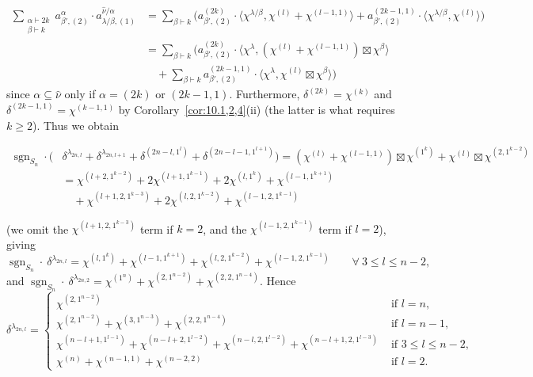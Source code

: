 \documentclass[ALCO, Unicode]{cedram}
\newcommand{\sgn}{\operatorname{sgn}}
\begin{document}
\begin{example}
\begin{align*}
		\sum_{\substack{\alpha\vdash 2k\\\beta\vdash k}} a^{\alpha}_{\beta',(2)}\cdot a^{\hat{\nu}/\alpha}_{\lambda/\beta,(1)} &= \sum_{\beta\vdash k} \big(a^{(2k)}_{\beta',(2)}\cdot\langle \chi^{\lambda/\beta},\chi^{(l)}+\chi^{(l-1,1)}\rangle + a^{(2k-1,1)}_{\beta',(2)}\cdot\langle\chi^{\lambda/\beta},\chi^{(l)}\rangle \big)\\
		&= \sum_{\beta\vdash k} \big(a^{(2k)}_{\beta',(2)}\cdot\langle \chi^{\lambda},(\chi^{(l)}+\chi^{(l-1,1)})\boxtimes\chi^\beta\rangle \\&\quad+ \sum_{\beta\vdash k}a^{(2k-1,1)}_{\beta',(2)}\cdot\langle\chi^{\lambda},\chi^{(l)}\boxtimes\chi^\beta\rangle \big)
	\end{align*}
	since $\alpha\subseteq\hat{\nu}$ only if $\alpha=(2k)$ or $(2k-1,1)$. Furthermore, $\delta^{(2k)}=\chi^{(k)}$ and $\delta^{(2k-1,1)}=\chi^{(k-1,1)}$ by Corollary~\ref{cor:10.1,2,4}(ii) (the latter is what requires $k\ge 2$). Thus we obtain
	
	\begin{footnotesize}
		\begin{align}\label{eqn:14.8b}
			\sgn_{S_n}\cdot(&\delta^{\lambda_{2n,l}} + \delta^{\lambda_{2n,l+1}} + \delta^{(2n-l,1^l)} + \delta^{(2n-l-1,1^{l+1})}) = (\chi^{(l)}+\chi^{(l-1,1)})\boxtimes\chi^{(1^k)} + \chi^{(l)}\boxtimes\chi^{(2,1^{k-2})}\nonumber\\
			&= \chi^{(l+2,1^{k-2})} + 2\chi^{(l+1,1^{k-1})} + 2\chi^{(l,1^k)} + \chi^{(l-1,1^{k+1})}\nonumber\\&\quad +\chi^{(l+1,2,1^{k-3})} + 2\chi^{(l,2,1^{k-2})}+\chi^{(l-1,2,1^{k-1})}
		\end{align}
	\end{footnotesize}
(we omit the $\chi^{(l+1,2,1^{k-3})}$ term if $k=2$, and the $\chi^{(l-1,2,1^{k-1})}$ term if $l=2$), giving
	\[ \sgn_{S_n}\cdot\ \delta^{\lambda_{2n,l}} = \chi^{(l,1^k)}+\chi^{(l-1,1^{k+1})} + \chi^{(l,2,1^{k-2})} + \chi^{(l-1,2,1^{k-1})}\qquad\forall\ 3\le l\le n-2, \]
	and $\sgn_{S_n}\cdot\ \delta^{\lambda_{2n,2}} = \chi^{(1^n)}+\chi^{(2,1^{n-2})}+\chi^{(2,2,1^{n-4})}$. Hence	
	\footnotesize
	\[ \delta^{\lambda_{2n,l}} = \begin{cases}
		\chi^{(2,1^{n-2})} & \text{ if } l=n,\\
		\chi^{(2,1^{n-2})} + \chi^{(3,1^{n-3})} + \chi^{(2,2,1^{n-4})} & \text{ if } l=n-1,\\
		\chi^{(n-l+1,1^{l-1})} + \chi^{(n-l+2,1^{l-2})} + \chi^{(n-l,2,1^{l-2})} + \chi^{(n-l+1,2,1^{l-3})} & \text{ if }3\le l\le n-2,\\
		\chi^{(n)} + \chi^{(n-1,1)} + \chi^{(n-2,2)} & \text{ if }l=2.
	\end{cases} \]
	\normalsize
\end{example}
\end{document}
